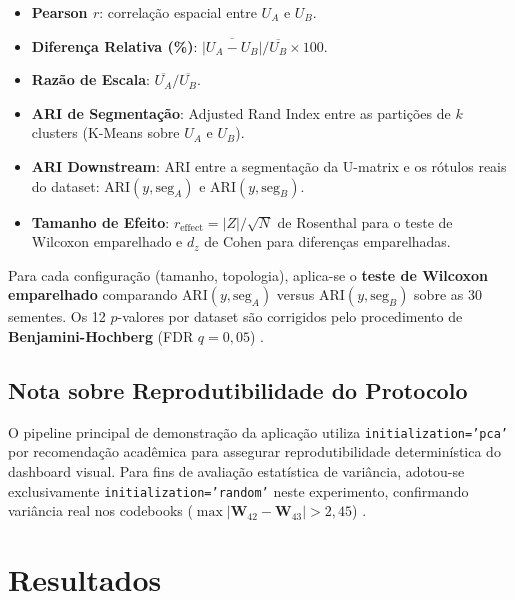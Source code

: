 \documentclass[10pt,journal,compsoc,twocolumn]{IEEEtran}
\begin{document}
\begin{itemize}
    \item \textbf{Pearson $r$}: correla\c{c}\~ao espacial entre $U_A$ e $U_B$.
    \item \textbf{Diferen\c{c}a Relativa (\%)}: $\overline{|U_A - U_B|} / \overline{U_B} \times 100$.
    \item \textbf{Raz\~ao de Escala}: $\overline{U_A} / \overline{U_B}$.
    \item \textbf{ARI de Segmenta\c{c}\~ao}: Adjusted Rand Index entre as
    parti\c{c}\~oes de $k$ clusters (K-Means sobre $U_A$ e $U_B$).
    \item \textbf{ARI Downstream}: ARI entre a segmenta\c{c}\~ao da U-matrix
    e os r\'otulos reais do dataset: $\text{ARI}(y, \text{seg}_A)$ e
    $\text{ARI}(y, \text{seg}_B)$.
    \item \textbf{Tamanho de Efeito}: $r_\text{effect} = |Z| / \sqrt{N}$
    de Rosenthal para o teste de Wilcoxon emparelhado e $d_z$ de Cohen para
    diferen\c{c}as emparelhadas.
\end{itemize}

Para cada configura\c{c}\~ao (tamanho, topologia), aplica-se o \textbf{teste de
Wilcoxon emparelhado} \cite{wilcoxon1945individual} comparando
$\text{ARI}(y, \text{seg}_A)$ versus $\text{ARI}(y, \text{seg}_B)$ sobre
as 30 sementes. Os 12 $p$-valores por dataset s\~ao corrigidos pelo
procedimento de \textbf{Benjamini-Hochberg} (FDR $q = 0{,}05$)
\cite{benjamini1995controlling}.

\subsection{Nota sobre Reprodutibilidade do Protocolo}
\label{subsec:meta_note}
O pipeline principal de demonstra\c{c}\~ao da aplica\c{c}\~ao utiliza
\texttt{initialization='pca'} por recomenda\c{c}\~ao acad\^emica para
assegurar reprodutibilidade determin\'istica do dashboard visual. Para
fins de avalia\c{c}\~ao estat\'istica de vari\^ancia, adotou-se
exclusivamente \texttt{initialization='random'} neste experimento,
confirmando vari\^ancia real nos codebooks ($\max |\mathbf{W}_{42} - \mathbf{W}_{43}| > 2{,}45$)
\cite{stodden2014implementing}.

\section{Resultados}
\label{sec:resultados}
\end{document}
